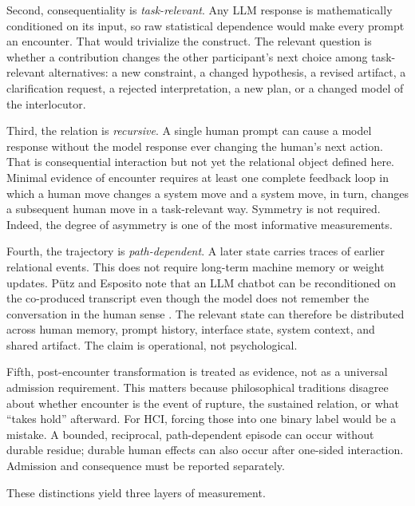 \documentclass[11pt]{article}
\begin{document}
Second, consequentiality is \emph{task-relevant}. Any LLM response is mathematically conditioned on its input, so raw statistical dependence would make every prompt an encounter. That would trivialize the construct. The relevant question is whether a contribution changes the other participant's next choice among task-relevant alternatives: a new constraint, a changed hypothesis, a revised artifact, a clarification request, a rejected interpretation, a new plan, or a changed model of the interlocutor.

Third, the relation is \emph{recursive}. A single human prompt can cause a model response without the model response ever changing the human's next action. That is consequential interaction but not yet the relational object defined here. Minimal evidence of encounter requires at least one complete feedback loop in which a human move changes a system move and a system move, in turn, changes a subsequent human move in a task-relevant way. Symmetry is not required. Indeed, the degree of asymmetry is one of the most informative measurements.

Fourth, the trajectory is \emph{path-dependent}. A later state carries traces of earlier relational events. This does not require long-term machine memory or weight updates. P\"utz and Esposito note that an LLM chatbot can be reconditioned on the co-produced transcript even though the model does not remember the conversation in the human sense \citep{PutzEsposito2024Repair}. The relevant state can therefore be distributed across human memory, prompt history, interface state, system context, and shared artifact. The claim is operational, not psychological.

Fifth, post-encounter transformation is treated as evidence, not as a universal admission requirement. This matters because philosophical traditions disagree about whether encounter is the event of rupture, the sustained relation, or what ``takes hold'' afterward. For HCI, forcing those into one binary label would be a mistake. A bounded, reciprocal, path-dependent episode can occur without durable residue; durable human effects can also occur after one-sided interaction. Admission and consequence must be reported separately.

These distinctions yield three layers of measurement.
\end{document}
